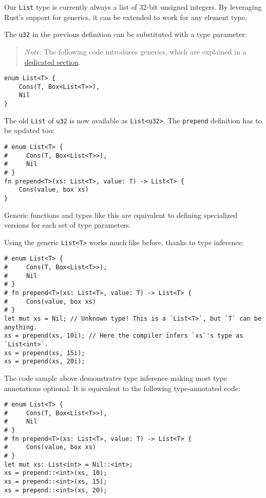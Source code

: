 \documentclass[]{article}
\begin{document}
Our \texttt{List} type is currently always a list of 32-bit unsigned
integers. By leveraging Rust's support for generics, it can be extended
to work for any element type.

The \texttt{u32} in the previous definition can be substituted with a
type parameter:

\begin{quote}
\emph{Note:} The following code introduces generics, which are explained
in a \hyperref[generics]{dedicated section}.
\end{quote}

\begin{verbatim}
enum List<T> {
    Cons(T, Box<List<T>>),
    Nil
}
\end{verbatim}

The old \texttt{List} of \texttt{u32} is now available as
\texttt{List\textless{}u32\textgreater{}}. The \texttt{prepend}
definition has to be updated too:

\begin{verbatim}
# enum List<T> {
#     Cons(T, Box<List<T>>),
#     Nil
# }
fn prepend<T>(xs: List<T>, value: T) -> List<T> {
    Cons(value, box xs)
}
\end{verbatim}

Generic functions and types like this are equivalent to defining
specialized versions for each set of type parameters.

Using the generic \texttt{List\textless{}T\textgreater{}} works much
like before, thanks to type inference:

\begin{verbatim}
# enum List<T> {
#     Cons(T, Box<List<T>>),
#     Nil
# }
# fn prepend<T>(xs: List<T>, value: T) -> List<T> {
#     Cons(value, box xs)
# }
let mut xs = Nil; // Unknown type! This is a `List<T>`, but `T` can be anything.
xs = prepend(xs, 10i); // Here the compiler infers `xs`'s type as `List<int>`.
xs = prepend(xs, 15i);
xs = prepend(xs, 20i);
\end{verbatim}

The code sample above demonstrates type inference making most type
annotations optional. It is equivalent to the following type-annotated
code:

\begin{verbatim}
# enum List<T> {
#     Cons(T, Box<List<T>>),
#     Nil
# }
# fn prepend<T>(xs: List<T>, value: T) -> List<T> {
#     Cons(value, box xs)
# }
let mut xs: List<int> = Nil::<int>;
xs = prepend::<int>(xs, 10);
xs = prepend::<int>(xs, 15);
xs = prepend::<int>(xs, 20);
\end{verbatim}
\end{document}
